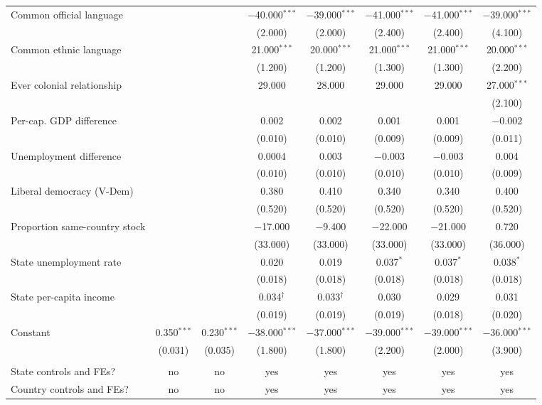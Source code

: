 \documentclass[
  11pt,
]{article}
\begin{document}
\begin{table}[H]
\begin{tabular}{@{\extracolsep{2pt}}lccccccc}
  Common official language &  &  & $-$40.000$^{***}$ & $-$39.000$^{***}$ & $-$41.000$^{***}$ & $-$41.000$^{***}$ & $-$39.000$^{***}$ \\ 
  &  &  & (2.000) & (2.000) & (2.400) & (2.400) & (4.100) \\ 
  Common ethnic language &  &  & 21.000$^{***}$ & 20.000$^{***}$ & 21.000$^{***}$ & 21.000$^{***}$ & 20.000$^{***}$ \\ 
  &  &  & (1.200) & (1.200) & (1.300) & (1.300) & (2.200) \\ 
  Ever colonial relationship &  &  & 29.000 & 28.000 & 29.000 & 29.000 & 27.000$^{***}$ \\ 
  &  &  &  &  &  &  & (2.100) \\ 
  Per-cap. GDP difference &  &  & 0.002 & 0.002 & 0.001 & 0.001 & $-$0.002 \\ 
  &  &  & (0.010) & (0.010) & (0.009) & (0.009) & (0.011) \\ 
  Unemployment difference &  &  & 0.0004 & 0.003 & $-$0.003 & $-$0.003 & 0.004 \\ 
  &  &  & (0.010) & (0.010) & (0.010) & (0.010) & (0.009) \\ 
  Liberal democracy (V-Dem) &  &  & 0.380 & 0.410 & 0.340 & 0.340 & 0.400 \\ 
  &  &  & (0.520) & (0.520) & (0.520) & (0.520) & (0.520) \\ 
  Proportion same-country stock &  &  & $-$17.000 & $-$9.400 & $-$22.000 & $-$21.000 & 0.720 \\ 
  &  &  & (33.000) & (33.000) & (33.000) & (33.000) & (36.000) \\ 
  State unemployment rate &  &  & 0.020 & 0.019 & 0.037$^{*}$ & 0.037$^{*}$ & 0.038$^{*}$ \\ 
  &  &  & (0.018) & (0.018) & (0.018) & (0.018) & (0.018) \\ 
  State per-capita income &  &  & 0.034$^{†}$ & 0.033$^{†}$ & 0.030 & 0.029 & 0.031 \\ 
  &  &  & (0.019) & (0.019) & (0.019) & (0.018) & (0.020) \\ 
  Constant & 0.350$^{***}$ & 0.230$^{***}$ & $-$38.000$^{***}$ & $-$37.000$^{***}$ & $-$39.000$^{***}$ & $-$39.000$^{***}$ & $-$36.000$^{***}$ \\ 
  & (0.031) & (0.035) & (1.800) & (1.800) & (2.200) & (2.000) & (3.900) \\ 
 \hline \\[-1.8ex] 
State controls and FEs? & no & no & yes & yes & yes & yes & yes \\ 
Country controls and FEs? & no & no & yes & yes & yes & yes & yes \\ 

\end{tabular}
\end{table}
\end{document}

